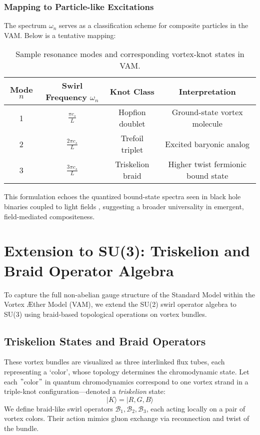 \subsubsection*{Mapping to Particle-like Excitations}

The spectrum \( \omega_n \) serves as a classification scheme for composite particles in the VAM. Below is a tentative mapping:

\begin{table}[H]
    \centering
    \footnotesize
    \renewcommand{\arraystretch}{1.4}
    \begin{tabular}{|c|c|c|c|}
        \hline
        \textbf{Mode} \( n \) & \textbf{Swirl Frequency} \( \omega_n \) & \textbf{Knot Class} & \textbf{Interpretation} \\
        \hline
        1 & \( \frac{\pi c_s}{L} \) & Hopfion doublet & Ground-state vortex molecule \\
        2 & \( \frac{2\pi c_s}{L} \) & Trefoil triplet & Excited baryonic analog \\
        3 & \( \frac{3\pi c_s}{L} \) & Triskelion braid & Higher twist fermionic bound state \\
        \hline
    \end{tabular}
    \caption{Sample resonance modes and corresponding vortex-knot states in VAM.}
\end{table}

This formulation echoes the quantized bound-state spectra seen in black hole binaries coupled to light fields \cite{baumann2023black}, suggesting a broader universality in emergent, field-mediated compositeness.



\section{Extension to SU(3): Triskelion and Braid Operator Algebra}

To capture the full non-abelian gauge structure of the Standard Model within the Vortex Æther Model (VAM), we extend the SU(2) swirl operator algebra to SU(3) using braid-based topological operations on vortex bundles.

\subsection*{Triskelion States and Braid Operators}

These vortex bundles are visualized as three interlinked flux tubes, each representing a ‘color’, whose topology determines the chromodynamic state.
Let each \("\)color\("\) in quantum chromodynamics correspond to one vortex strand in a triple-knot configuration—denoted a \textit{triskelion} state:
\[
|K\rangle = |R, G, B\rangle
\]
We define braid-like swirl operators \( \mathcal{B}_1, \mathcal{B}_2, \mathcal{B}_3 \), each acting locally on a pair of vortex colors. Their action mimics gluon exchange via reconnection and twist of the bundle.

